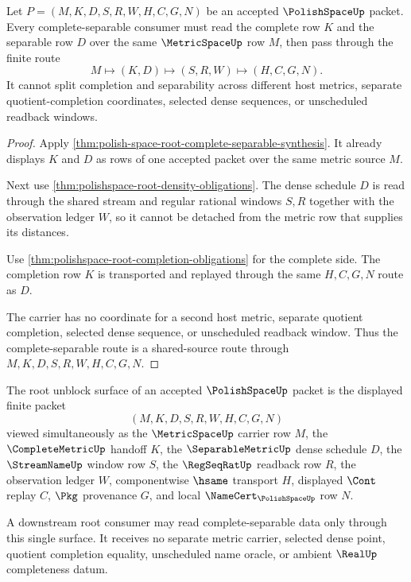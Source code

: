 \begin{theorem}
\label{thm:polish-space-complete-separable-shared-source-route}
Let $P=(M,K,D,S,R,W,H,C,G,N)$ be an accepted $\PolishSpaceUp$ packet. Every complete-separable consumer must read the complete row $K$ and the separable row $D$ over the same $\MetricSpaceUp$ row $M$, then pass through the finite route
$$
M \longmapsto (K,D) \longmapsto (S,R,W) \longmapsto (H,C,G,N).
$$
It cannot split completion and separability across different host metrics, separate quotient-completion coordinates, selected dense sequences, or unscheduled readback windows.
\end{theorem}
\begin{proof}
Apply \autoref{thm:polish-space-root-complete-separable-synthesis}. It already displays $K$ and $D$ as rows of one accepted packet over the same metric source $M$.

Next use \autoref{thm:polishspace-root-density-obligations}. The dense schedule $D$ is read through the shared stream and regular rational windows $S,R$ together with the observation ledger $W$, so it cannot be detached from the metric row that supplies its distances.

Use \autoref{thm:polishspace-root-completion-obligations} for the complete side. The completion row $K$ is transported and replayed through the same $H,C,G,N$ route as $D$.

The carrier has no coordinate for a second host metric, separate quotient completion, selected dense sequence, or unscheduled readback window. Thus the complete-separable route is a shared-source route through $M,K,D,S,R,W,H,C,G,N$.
\end{proof}

\begin{definition}
\label{def:polish-space-root-unblock-surface}
The root unblock surface of an accepted $\PolishSpaceUp$ packet is the
displayed finite packet
$$
(M,K,D,S,R,W,H,C,G,N)
$$
viewed simultaneously as the $\MetricSpaceUp$ carrier row $M$, the
$\CompleteMetricUp$ handoff $K$, the $\SeparableMetricUp$ dense schedule $D$,
the $\StreamNameUp$ window row $S$, the $\RegSeqRatUp$ readback row $R$, the
observation ledger $W$, componentwise $\hsame$ transport $H$, displayed
$\Cont$ replay $C$, $\Pkg$ provenance $G$, and local
$\NameCert_{\PolishSpaceUp}$ row $N$.

A downstream root consumer may read complete-separable data only through this
single surface. It receives no separate metric carrier, selected dense point,
quotient completion equality, unscheduled name oracle, or ambient
$\RealUp$ completeness datum.
\end{definition}

